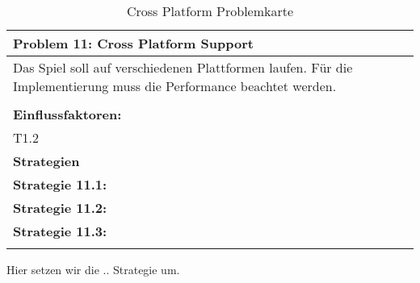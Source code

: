 \documentclass[fontsize=12pt,paper=a4,twoside]{scrartcl}
\begin{document}
\begin{table}[H]
    \centering
    \begin{tabular}{|p{15cm}|}
    \hline
          \textbf{Problem 11: Cross Platform Support}  \\ \hline
	Das Spiel soll auf verschiedenen Plattformen laufen. Für die Implementierung muss die Performance beachtet werden. \\
         \\ \hline
          \textbf{Einflussfaktoren: } \\
	T1.2 \\
          \hline
          \textbf{Strategien} \\ \hline
            {}          
           \label{strategie:11.1}     
          \textbf{Strategie 11.1:}  \\        
  {}          
           \label{strategie:11.2}              
          \textbf{Strategie 11.2:}  \\
	 {}          
           \label{strategie:11.3}     
          \textbf{Strategie 11.3: }  \\ 
	 \\ \hline
    \end{tabular}

    \caption{Cross Platform Problemkarte}
    \label{tab:ProblemKarte11}
\end{table}
Hier setzen wir die .. Strategie um. \\
\end{document}

